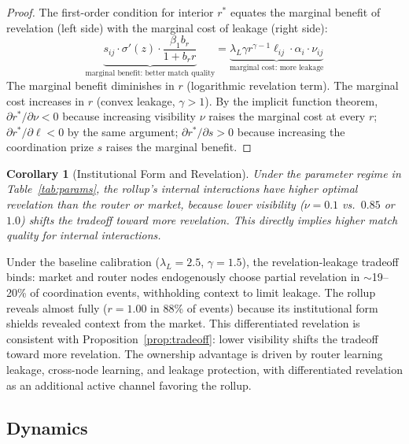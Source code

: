 \documentclass[12pt]{article}
\newtheorem{corollary}{Corollary}
\theoremstyle{definition}
\begin{document}
\begin{proof}
The first-order condition for interior $r^*$ equates the marginal benefit of revelation (left side) with the marginal cost of leakage (right side):
\[
\underbrace{s_{ij} \cdot \sigma'(z) \cdot \frac{\beta_1 b_r}{1 + b_r r}}_{\text{marginal benefit: better match quality}} = \underbrace{\lambda_L \gamma r^{\gamma-1} \ell_{ij} \cdot \alpha_i \cdot \nu_{ij}}_{\text{marginal cost: more leakage}}
\]
The marginal benefit diminishes in $r$ (logarithmic revelation term). The marginal cost increases in $r$ (convex leakage, $\gamma > 1$). By the implicit function theorem, $\partial r^* / \partial \nu < 0$ because increasing visibility $\nu$ raises the marginal cost at every $r$; $\partial r^* / \partial \ell < 0$ by the same argument; $\partial r^* / \partial s > 0$ because increasing the coordination prize $s$ raises the marginal benefit.
\end{proof}

\begin{corollary}[Institutional Form and Revelation]
\label{cor:revelation}
Under the parameter regime in Table~\ref{tab:params}, the rollup's internal interactions have higher optimal revelation than the router or market, because lower visibility ($\nu = 0.1$ vs.\ $0.85$ or $1.0$) shifts the tradeoff toward more revelation. This directly implies higher match quality for internal interactions.
\end{corollary}

\begin{remark}
Under the baseline calibration ($\lambda_L = 2.5$, $\gamma = 1.5$), the revelation-leakage tradeoff binds: market and router nodes endogenously choose partial revelation in $\sim$19--20\% of coordination events, withholding context to limit leakage. The rollup reveals almost fully ($r = 1.00$ in 88\% of events) because its institutional form shields revealed context from the market. This differentiated revelation is consistent with Proposition~\ref{prop:tradeoff}: lower visibility shifts the tradeoff toward more revelation. The ownership advantage is driven by router learning leakage, cross-node learning, and leakage protection, with differentiated revelation as an additional active channel favoring the rollup.
\end{remark}

\subsection{Dynamics}
\end{document}
